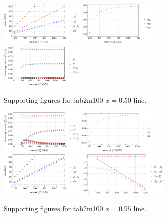 \documentclass[a4paper,10pt,captions=tableheading,DIV=14]{scrartcl}
\numberwithin{equation}{section}
\begin{document}
\begin{figure}[h!]\centering
 \includegraphics[height=60pt]{../plots/plot_tab2m100x050_mass.pdf}
 \includegraphics[height=60pt]{../plots/plot_tab2m100x050_cfactors.pdf}
 \includegraphics[height=60pt]{../plots/plot_tab2m100x050_br21.pdf}
\caption{Supporting figures for tab2m100 $x=0.50$ line.}
\end{figure}
\begin{figure}[h!]\centering
 \includegraphics[height=60pt]{../plots/plot_tab2m100x095_br21.pdf}
 \includegraphics[height=60pt]{../plots/plot_tab2m100x095_cfactors.pdf}
 \includegraphics[height=60pt]{../plots/plot_tab2m100x095_mass.pdf}
 \includegraphics[height=60pt]{../plots/plot_tab2m100x095_massdiff.pdf}
\caption{Supporting figures for tab2m100 $x=0.95$ line.}
\end{figure}
\end{document}
